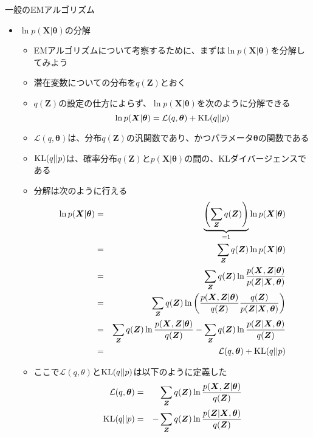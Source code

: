\documentclass[dvipdfmx,notheorems,t]{beamer}
\begin{document}
\begin{frame}{一般のEMアルゴリズム}

\begin{itemize}
	\item $\ln p(\bm{X} | \bm{\theta})$の分解
	\begin{itemize}
		\item EMアルゴリズムについて考察するために、まずは$\ln p(\bm{X} | \bm{\theta})$を分解してみよう
		\newline
		\item 潜在変数についての分布を$q(\bm{Z})$とおく
		\item $q(\bm{Z})$の設定の仕方によらず、$\ln p(\bm{X} | \bm{\theta})$を次のように分解できる
		\begin{equation}
			\ln p(\bm{X} | \bm{\theta}) = \mathcal{L}(q, \bm{\theta}) + \operatorname{KL} (q || p)
		\end{equation}
		
		\item $\mathcal{L}(q, \bm{\theta})$は、分布$q(\bm{Z})$の汎関数であり、かつパラメータ$\bm{\theta}$の関数である
		\item $\operatorname{KL} (q || p)$は、確率分布$q(\bm{Z})$と$p(\bm{X} | \bm{\theta})$の間の、\alert{KLダイバージェンス}である
		\newline
		\item 分解は次のように行える
		\begin{eqnarray}
			\ln p(\bm{X} | \bm{\theta}) &=& \underbrace{\left( \sum_{\bm{Z}} q(\bm{Z}) \right)}_{=1} \ln p(\bm{X} | \bm{\theta}) \nonumber \\
			&=& \sum_{\bm{Z}} q(\bm{Z}) \ln p(\bm{X} | \bm{\theta}) \nonumber \\
			&=& \sum_{\bm{Z}} q(\bm{Z}) \ln \frac{p(\bm{X}, \bm{Z} | \bm{\theta})}{p(\bm{Z} | \bm{X}, \bm{\theta})} \nonumber \\
			&=& \sum_{\bm{Z}} q(\bm{Z}) \ln \left( \frac{p(\bm{X}, \bm{Z} | \bm{\theta})}{q(\bm{Z})} \frac{q(\bm{Z})}{p(\bm{Z} | \bm{X}, \bm{\theta})} \right) \nonumber \\
			&=& \sum_{\bm{Z}} q(\bm{Z}) \ln \frac{p(\bm{X}, \bm{Z} | \bm{\theta})}{q(\bm{Z})} - \sum_{\bm{Z}} q(\bm{Z}) \ln \frac{p(\bm{Z} | \bm{X}, \bm{\theta})}{q(\bm{Z})} \nonumber \\
			&=& \mathcal{L}(q, \bm{\theta}) + \operatorname{KL} (q || p)
		\end{eqnarray}
		
		\item ここで$\mathcal{L}(q, \theta)$と$\operatorname{KL} (q || p)$は以下のように定義した
		\begin{eqnarray}
			\mathcal{L}(q, \bm{\theta}) &=& \sum_{\bm{Z}} q(\bm{Z}) \ln \frac{p(\bm{X}, \bm{Z} | \bm{\theta})}{q(\bm{Z})} \\
			\operatorname{KL} (q || p) &=& - \sum_{\bm{Z}} q(\bm{Z}) \ln \frac{p(\bm{Z} | \bm{X}, \bm{\theta})}{q(\bm{Z})}
		\end{eqnarray}
		

\end{itemize}
\end{itemize}
\end{frame}
\end{document}
